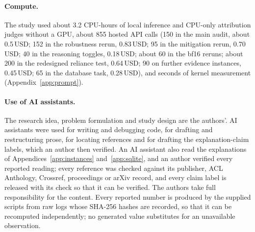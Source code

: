 \paragraph{Compute.}
The study used about 3.2 CPU-hours of local inference and CPU-only attribution judges without a GPU, about 855 hosted API calls (150 in the main audit, about 0.5\,USD; 152 in the robustness rerun, 0.83\,USD; 95 in the mitigation rerun, 0.70\,USD; 40 in the reasoning toggles, 0.18\,USD; about 60 in the bf16 reruns; about 200 in the redesigned reliance test, 0.64\,USD; 90 on further evidence instances, 0.45\,USD; 65 in the database task, 0.28\,USD), and seconds of kernel measurement (Appendix~\ref{app:prompt}).

\paragraph{Use of AI assistants.}
The research idea, problem formulation and study design are the authors'. AI assistants were used for writing and debugging code, for drafting and restructuring prose, for locating references and for drafting the explanation-claim labels, which an author then verified. An AI assistant also read the explanations of Appendices~\ref{app:instances} and~\ref{app:sqlite}, and an author verified every reported reading; every reference was checked against its publisher, ACL Anthology, Crossref, proceedings or arXiv record, and every claim label is released with its check so that it can be verified. The authors take full responsibility for the content. Every reported number is produced by the supplied scripts from raw logs whose SHA-256 hashes are recorded, so that it can be recomputed independently; no generated value substitutes for an unavailable observation.

